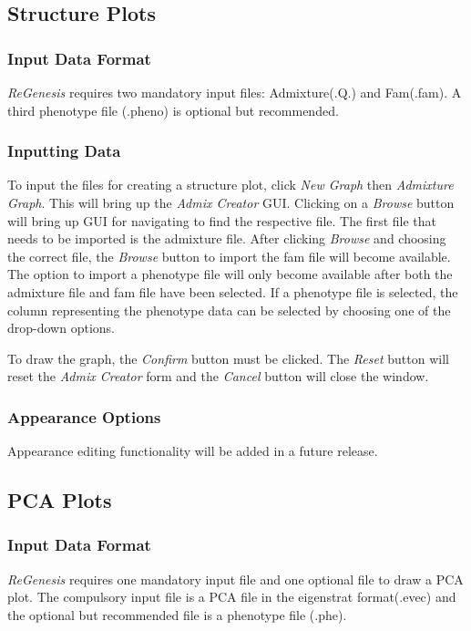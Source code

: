 \documentclass[11pt]{article}
\begin{document}
\subsection{Structure Plots}
\subsubsection{Input Data Format}
\textit{ReGenesis} requires two mandatory input files: Admixture(.Q.) and Fam(.fam). A third phenotype file (.pheno) is optional but recommended.

\subsubsection{Inputting Data}
To input the files for creating a structure plot, click \textit{New Graph} then \textit{Admixture Graph}. This will bring up the \textit{Admix Creator} GUI.
Clicking on a \textit{Browse} button will bring up GUI for navigating to find the respective file.
The first file that needs to be imported is the admixture file. After clicking \textit{Browse} and choosing the correct file, the \textit{Browse} button to import the fam file will become available. The option to import a phenotype file will only become available after both the admixture file and fam file have been selected. If a phenotype file is selected, the column representing the phenotype data can be selected by choosing one of the drop-down options.

To draw the graph, the \textit{Confirm} button must be clicked. The \textit{Reset} button will reset the \textit{Admix Creator} form and the \textit{Cancel} button will close the window.
\subsubsection{Appearance Options}
Appearance editing functionality will be added in a future release.
\subsection{PCA Plots}
\subsubsection{Input Data Format}
\textit{ReGenesis} requires one mandatory input file and one optional file to draw a PCA plot. The compulsory input file is a PCA file in the eigenstrat format(.evec) and the optional but recommended file is a phenotype file (.phe).
\end{document}
